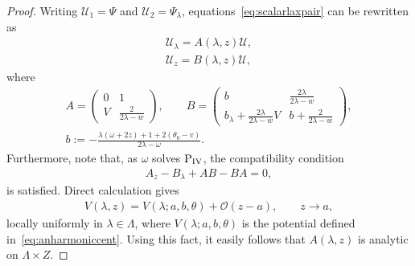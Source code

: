 \documentclass[pdftex]{sigma}
\numberwithin{equation}{section}
\newcommand{\om}{\omega}
\begin{document}
\begin{proof}
Writing $\mathcal{U}_1=\Psi$ and $\mathcal{U}_2=\Psi_\lambda$, equations~\eqref{eq:scalarlaxpair} can be rewritten as
\begin{subequations}\label{eq:U}
\begin{gather}
\mathcal{U}_\lambda =A(\lambda,z)\mathcal{U},\label{eq:U1}\\
\mathcal{U}_z =B(\lambda,z)\mathcal{U},\label{eq:U2}
\end{gather}
\end{subequations}
where
\begin{gather*}
A=\begin{pmatrix}
0 & 1\\
V& \frac{2}{2\lambda-w}
\end{pmatrix},\qquad B=\begin{pmatrix}
b & \frac{2\lambda}{2\lambda-w}\\
b_\lambda+\frac{2\lambda}{2\lambda-w} V & b+\frac{2}{2\lambda-w}
\end{pmatrix},\\
b:=-\frac{\lambda(\om+2z)+1+2(\theta_0-v)}{2\lambda-\om}.
\end{gather*}
Furthermore, note that, as $\om$ solves ${\rm P}_{\rm IV}$, the compatibility condition
\begin{gather}\label{eq:compatibility}
A_z-B_\lambda+AB-BA=0,
\end{gather}
is satisf\/ied. Direct calculation gives
\begin{gather}\label{eq:Vconvergence}
V(\lambda,z)=V(\lambda;a,b,\theta)+\mathcal{O}(z-a),\qquad z\rightarrow a,
\end{gather}
locally uniformly in $\lambda\in \Lambda$, where $V(\lambda;a,b,\theta)$ is the potential def\/ined in~\eqref{eq:anharmoniccent}. Using this fact, it easily follows that $A(\lambda,z)$ is analytic on $\Lambda\times Z$.


\end{proof}
\end{document}

